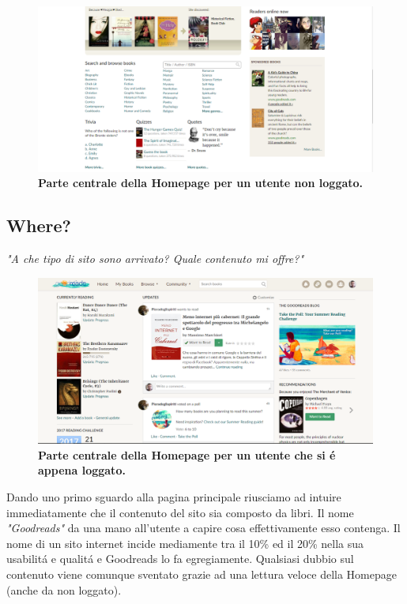 \documentclass[12pt]{article}
\begin{document}
\begin{figure}
	\centering 
	\includegraphics[width=16.5cm]{resources/homenotlogged_2.png}
	\caption{\textbf{Parte centrale della Homepage per un utente non loggato.}}
\end{figure}


\subsection{Where?}
\begin{center}
{\large \textit{"A che tipo di sito sono arrivato? Quale contenuto mi offre?"}}
\end{center}
\begin{figure}
	\centering 
	\includegraphics[width=16.5cm]{resources/homelogged_1.png}
	\caption{\textbf{Parte centrale della Homepage per un utente che si \'e appena loggato.}}
\end{figure}

\noindent Dando uno primo sguardo alla pagina principale riusciamo ad intuire immediatamente che il contenuto del sito sia composto da libri. Il nome \textit{"Goodreads"} da una mano all'utente a capire cosa effettivamente esso contenga. Il nome di un sito internet incide mediamente tra il 10\% ed il 20\% nella sua usabilit\'a e qualit\'a e Goodreads lo fa egregiamente.
Qualsiasi dubbio sul contenuto viene comunque sventato grazie ad una lettura veloce della Homepage (anche da non loggato).
\end{document}

